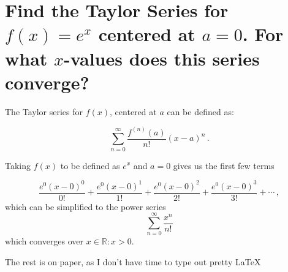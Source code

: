 \documentclass[12pt, letterpaper]{article}
\begin{document}
\hfill\blacksquare%
\clearpage
\section{Find the Taylor Series for $f{(x)}=e^x$ centered at $a=0$.
For what $x$-values does this series converge?}

The Taylor series for $f(x)$, centered at $a$ can be defined as: 

\begin{equation}
	\sum_{n=0}^{\infty} \frac{f^{(n)}(a)}{n!} {(x-a)}^{n}\,.	
\end{equation}

Taking $f(x)$ to be defined as $e^x$ and $a = 0$ gives us the first few terms

\begin{equation}
	\frac{e^{0}{{(x-0)}^{0}}}{0!} +
	\frac{e^{0}{(x-0)}^{1}}{1!} +
	\frac{e^{0}{(x-0)}^{2}}{2!} +
	\frac{e^{0}{(x-0)}^{3}}{3!} + \cdots \,,
\end{equation}
which can be simplified to the power series
\begin{equation}
	\sum_{n=0}^{\infty} \frac{x^n}{n!}
\end{equation}
which converges over $x \in \mathbb{R} : x > 0$.

\hfill\blacksquare%

\begin{center}
	The rest is on paper, as I don't have time to type out pretty \LaTeX%
\end{center}
\end{document}
